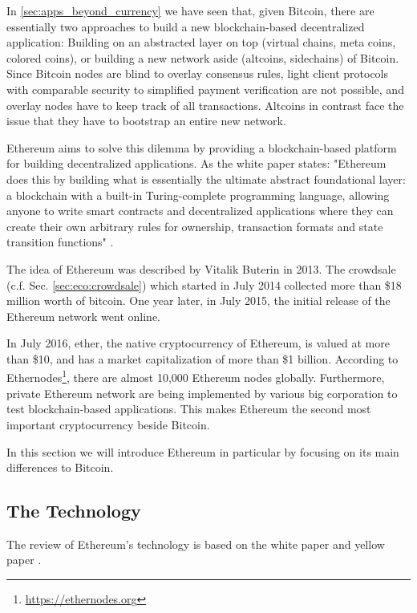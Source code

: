 In \ref{sec:apps_beyond_currency} we have seen that, given Bitcoin, there are essentially two approaches to build a new blockchain-based decentralized application: Building on an abstracted layer on top (virtual chains, meta coins, colored coins), or building a new network aside (altcoins, sidechains) of Bitcoin. Since Bitcoin nodes are blind to overlay consensus rules, light client protocols with comparable security to simplified payment verification are not possible, and overlay nodes have to keep track of all transactions. Altcoins in contrast face the issue that they have to bootstrap an entire new network.

Ethereum aims to solve this dilemma by providing a blockchain-based platform for building decentralized applications. As the white paper states: "Ethereum does this by building what is essentially the ultimate abstract foundational layer: a blockchain with a built-in Turing-complete programming language, allowing anyone to write smart contracts and decentralized applications where they can create their own arbitrary rules for ownership, transaction formats and state transition functions" \parencite{ethereumWhite}.

The idea of Ethereum was described by Vitalik Buterin in 2013. The crowdsale (c.f. Sec. \ref{sec:eco:crowdsale}) which started in July 2014 collected more than \$18 million worth of bitcoin. One year later, in July 2015, the initial release of the Ethereum network went online. 

In July 2016, ether, the native cryptocurrency of Ethereum, is valued at more than \$10, and has a market capitalization of more than \$1 billion. According to Ethernodes\footnote{\url{https://ethernodes.org}}, there are almost 10,000 Ethereum nodes globally. Furthermore, private Ethereum network are being implemented by various big corporation to test blockchain-based applications. This makes Ethereum the second most important cryptocurrency beside Bitcoin.

In this section we will introduce Ethereum in particular by focusing on its main differences to Bitcoin. 

\subsection{The Technology}
\label{sec:ethereum:tech}

The review of Ethereum's technology is based on the white paper \parencite{ethereumWhite} and yellow paper \parencite{wood2014ethereum}. 

